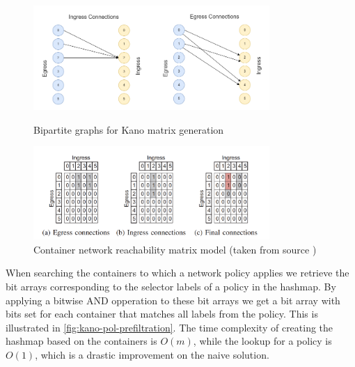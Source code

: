 \begin{figure}
\centering
    \begin{minipage}[b]{0.8\linewidth}
        \centering
        \includegraphics[width=0.8\textwidth]{images/kano-combined-connections-graph.png} 
        \caption{Bipartite graphs for Kano matrix generation} 
        \label{fig:kano-bipartite-graphs}
    \end{minipage}
    \begin{minipage}[b]{0.8\linewidth}
         \centering
          \includegraphics[width=0.8\textwidth]{images/kano-matrix-generation.png} 
          \caption{Container network reachability matrix model (taken from source \cite{kano})} 
          \label{fig:kano-reach-matrix}
    \end{minipage}
      
\end{figure}

When searching the containers to which a network policy applies we retrieve the bit arrays corresponding to the selector labels of a policy in the hashmap. By applying a bitwise AND opperation to these bit arrays we get a bit array with bits set for each container that matches all labels from the policy. This is illustrated in \autoref{fig:kano-pol-prefiltration}. The time complexity of creating the hashmap based on the containers is $O(m)$, while the lookup for a policy is $O(1)$, which is a drastic improvement on the naive solution.
\\[10pt]

